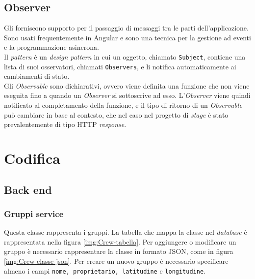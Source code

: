 \subsection{Observer}
Gli  forniscono supporto per il passaggio di messaggi tra le parti dell'applicazione. Sono usati frequentemente in Angular e sono una tecnica per la gestione ad eventi e la programmazione asincrona.\\
Il \textit{pattern}  è un \textit{design pattern} in cui un oggetto, chiamato \texttt{Subject}, contiene una lista di suoi osservatori, chiamati \texttt{Observers}, e li notifica automaticamente ai cambiamenti di stato.\\
Gli \textit{Observable} sono dichiarativi, ovvero viene definita una funzione che non viene eseguita fino a quando un \textit{Observer} si sottoscrive ad esso. L'\textit{Observer} viene quindi notificato al completamento della funzione, e il tipo di ritorno di un \textit{Observable} può cambiare in base al contesto, che nel caso nel progetto di \textit{stage} è stato prevalentemente di tipo HTTP \textit{response}. \\

\section{Codifica}
\subsection{Back end}
\subsubsection{Gruppi service}
\label{par:Crew}
Questa classe rappresenta i gruppi. La tabella che mappa la classe nel \textit{database} è rappresentata nella figura \ref{img:Crew-tabella}. Per aggiungere o modificare un gruppo è necessario rappresentare la classe in formato JSON, come in figura \ref{img:Crew-classe-json}. Per creare un nuovo gruppo è necessario specificare almeno i campi \texttt{nome, proprietario, latitudine} e \texttt{longitudine}. 


